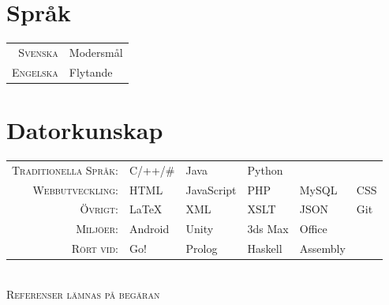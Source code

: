 \documentclass[a4paper,10pt]{article}
\begin{document}
\section{Språk}
\begin{tabular}{Dl}
\textsc{Svenska}		&	Modersmål\\
\textsc{Engelska}		&	Flytande\\
\end{tabular}

\section{Datorkunskap}
\def\arraystretch{1.2}%
\begin{tabu}to \textwidth{r X[c] X[c] X[c] X[c] X[c]}
\textsc{Traditionella Språk:}	&	C/++/\#	&	 Java		&	Python	&			&		\\
\textsc{Webbutveckling:}		&	 HTML		& 	JavaScript	&	PHP		&	MySQL	& 	CSS	\\
\textsc{Övrigt:}			& 	LaTeX		&	XML		&	XSLT		&	JSON		&	 Git	\\
\textsc{Miljöer:}			&	Android	& 	Unity		&	3ds Max	&	Office		&		\\
\textsc{Rört vid: }			&	Go!		&	 Prolog	&	Haskell	&	Assembly	&	 %
\end{tabu}
\\[0.3cm]

\centering\textsc{ Referenser lämnas på begäran}
\end{document}
